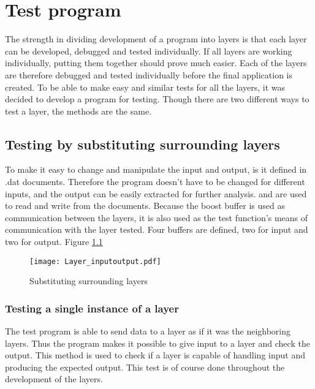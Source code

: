 
\chapter{Test program}\label{chap:test}


The strength in dividing development of a program into layers is that each layer can be developed, debugged and tested individually. If all layers are working individually, putting them together should prove much easier. Each of the layers are therefore debugged and tested individually before the final application is created. To be able to make easy and similar tests for all the layers, it was decided to develop a program for testing. Though there are two different ways to test a layer, the methods are the same.

\section{Testing by substituting surrounding layers}
To make it easy to change and manipulate the input and output, is it defined in .dat documents. Therefore the program doesn't have to be changed for different inputs, and the output can be easily extracted for further analysis.  and  are used to read and write from the documents. 
Because the boost buffer is used as communication between the layers, it is also used as the test function's means of communication with the layer tested. Four buffers  are defined, two for input and two for output.
Figure \ref{fig:Layer_inputoutput}

\begin{figure}[htb]
	\begin{center}
	\texttt{[image: Layer\_inputoutput.pdf]}
	\caption{Substituting surrounding layers}
	\label{fig:Layer_inputoutput}	
	\end{center}
\end{figure}

\subsection{Testing a single instance of a layer}  

 The test program is able to send data to a layer as if it was the neighboring layers. Thus the program makes it possible to give input to a layer and check the output. This method is used to check if a layer is capable of  handling input and producing the expected output. This test is of course done throughout the development of the layers.



